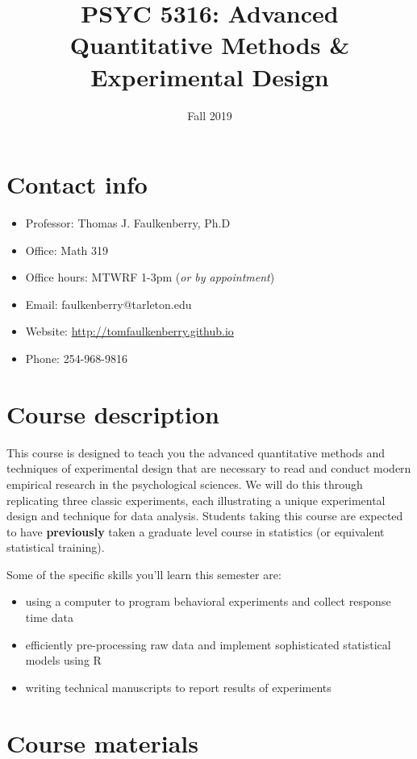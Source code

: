 \documentclass[10pt]{article}
\date{Fall 2019}
\title{PSYC 5316: Advanced Quantitative Methods \& Experimental Design}
\begin{document}
\maketitle

\section*{Contact info}
\label{sec:org43b356e}
\begin{itemize}
\item Professor: Thomas J. Faulkenberry, Ph.D
\item Office: Math 319
\item Office hours: MTWRF 1-3pm (\emph{or by appointment})
\item Email: faulkenberry@tarleton.edu
\item Website: \url{http://tomfaulkenberry.github.io}
\item Phone: 254-968-9816
\end{itemize}

\section*{Course description}
\label{sec:orgbddfc44}

This course is designed to teach you the advanced quantitative methods and techniques of experimental design that are necessary to read and conduct modern empirical research in the psychological sciences. We will do this through replicating three classic experiments, each illustrating a unique experimental design and technique for data analysis.  Students taking this course are expected to have \textbf{previously} taken a graduate level course in statistics (or equivalent statistical training). 

Some of the specific skills you'll learn this semester are:
\begin{itemize}
\item using a computer to program behavioral experiments and collect response time data
\item efficiently pre-processing raw data and implement sophisticated statistical models using R
\item writing technical manuscripts to report results of experiments
\end{itemize}

\section*{Course materials}
\label{sec:orgb1c50a4}
\end{document}
